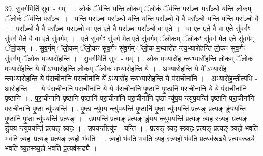 \documentclass[17pt]{extarticle}
\begin{document}
39. सु॒व॒र्गमिति॑ सुवः - गम् । . लो॒कं ॅय॑न्ति यन्ति लो॒कम् ॅलो॒कं ॅय॑न्ति॒ परा᳚ञ्चः॒ परा᳚ञ्चो यन्ति लो॒कम् ॅलो॒कं ॅय॑न्ति॒ परा᳚ञ्चः । . य॒न्ति॒ परा᳚ञ्चः॒ परा᳚ञ्चो यन्ति यन्ति॒ परा᳚ञ्चो॒ वै वै परा᳚ञ्चो यन्ति यन्ति॒ परा᳚ञ्चो॒ वै । . परा᳚ञ्चो॒ वै वै परा᳚ञ्चः॒ परा᳚ञ्चो॒ वा ए॒त ए॒ते वै परा᳚ञ्चः॒ परा᳚ञ्चो॒ वा ए॒ते । . वा ए॒त ए॒ते वै वा ए॒ते सु॑व॒र्गꣳ सु॑व॒र्ग मे॒ते वै वा ए॒ते सु॑व॒र्गम् । . ए॒ते सु॑व॒र्गꣳ सु॑व॒र्ग मे॒त ए॒ते सु॑व॒र्गम् ॅलो॒कम् ॅलो॒कꣳ सु॑व॒र्ग मे॒त ए॒ते सु॑व॒र्गम् ॅलो॒कम् । . सु॒व॒र्गम् ॅलो॒कम् ॅलो॒कꣳ सु॑व॒र्गꣳ सु॑व॒र्गम् ॅलो॒क म॒भ्यारो॑ह न्त्य॒भ्यारो॑हन्ति लो॒कꣳ सु॑व॒र्गꣳ सु॑व॒र्गम् ॅलो॒क म॒भ्यारो॑हन्ति । . सु॒व॒र्गमिति॑ सुवः - गम् । . लो॒क म॒भ्यारो॑ह न्त्य॒भ्यारो॑हन्ति लो॒कम् ॅलो॒क म॒भ्यारो॑हन्ति॒ ये ये᳚ ऽभ्यारो॑हन्ति लो॒कम् ॅलो॒क म॒भ्यारो॑हन्ति॒ ये । . अ॒भ्यारो॑हन्ति॒ ये ये᳚ ऽभ्यारो॑ह न्त्य॒भ्यारो॑हन्ति॒ ये प॑रा॒चीना॑नि परा॒चीना॑नि॒ ये᳚ ऽभ्यारो॑ह न्त्य॒भ्यारो॑हन्ति॒ ये प॑रा॒चीना॑नि । . अ॒भ्यारो॑ह॒न्तीत्य॑भि - आरो॑हन्ति । . ये प॑रा॒चीना॑नि परा॒चीना॑नि॒ ये ये प॑रा॒चीना॑नि पृ॒ष्ठानि॑ पृ॒ष्ठानि॑ परा॒चीना॑नि॒ ये ये प॑रा॒चीना॑नि पृ॒ष्ठानि॑ । . प॒रा॒चीना॑नि पृ॒ष्ठानि॑ पृ॒ष्ठानि॑ परा॒चीना॑नि परा॒चीना॑नि पृ॒ष्ठा न्यु॑प॒य न्त्यु॑प॒यन्ति॑ पृ॒ष्ठानि॑ परा॒चीना॑नि परा॒चीना॑नि पृ॒ष्ठा न्यु॑प॒यन्ति॑ । . पृ॒ष्ठा न्यु॑प॒य न्त्यु॑प॒यन्ति॑ पृ॒ष्ठानि॑ पृ॒ष्ठा न्यु॑प॒यन्ति॑ प्र॒त्यङ् प्र॒त्यङ् ङु॑प॒यन्ति॑ पृ॒ष्ठानि॑ पृ॒ष्ठा न्यु॑प॒यन्ति॑ प्र॒त्यङ् । . उ॒प॒यन्ति॑ प्र॒त्यङ् प्र॒त्यङ् ङु॑प॒य न्त्यु॑प॒यन्ति॑ प्र॒त्यङ् त्र्य॒ह स्त्र्य॒हः प्र॒त्यङ् ङु॑प॒य न्त्यु॑प॒यन्ति॑ प्र॒त्यङ् त्र्य॒हः । . उ॒प॒यन्तीत्यु॑प - यन्ति॑ । . प्र॒त्यङ् त्र्य॒ह स्त्र्य॒हः प्र॒त्यङ् प्र॒त्यङ् त्र्य॒हो भ॑वति भवति त्र्य॒हः प्र॒त्यङ् प्र॒त्यङ् त्र्य॒हो भ॑वति । . त्र्य॒हो भ॑वति भवति त्र्य॒ह स्त्र्य॒हो भ॑वति प्र॒त्यव॑रूढ्यै प्र॒त्यव॑रूढ्यै भवति त्र्य॒हस्त्र्य॒हो भ॑वति प्र॒त्यव॑रूढ्यै । \newline
\end{document}
